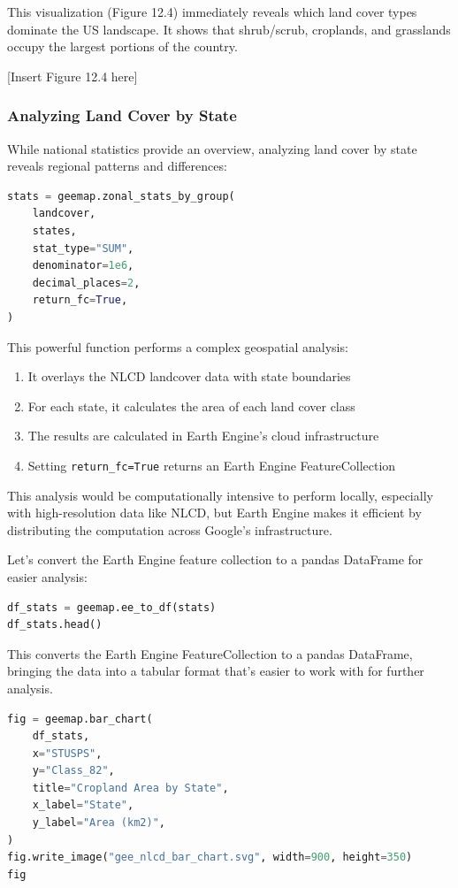 This visualization (Figure 12.4) immediately reveals which land cover types dominate the US landscape. It shows that shrub/scrub, croplands, and grasslands occupy the largest portions of the country.

[Insert Figure 12.4 here]

\subsubsection{Analyzing Land Cover by State}

While national statistics provide an overview, analyzing land cover by state reveals regional patterns and differences:

\begin{lstlisting}[language=Python]
stats = geemap.zonal_stats_by_group(
    landcover,
    states,
    stat_type="SUM",
    denominator=1e6,
    decimal_places=2,
    return_fc=True,
)
\end{lstlisting}

This powerful function performs a complex geospatial analysis:

\begin{enumerate}
\item It overlays the NLCD landcover data with state boundaries
\item For each state, it calculates the area of each land cover class
\item The results are calculated in Earth Engine's cloud infrastructure
\item Setting \texttt{return\_fc=True} returns an Earth Engine FeatureCollection
\end{enumerate}

This analysis would be computationally intensive to perform locally, especially with high-resolution data like NLCD, but Earth Engine makes it efficient by distributing the computation across Google's infrastructure.

Let's convert the Earth Engine feature collection to a pandas DataFrame for easier analysis:

\begin{lstlisting}[language=Python]
df_stats = geemap.ee_to_df(stats)
df_stats.head()
\end{lstlisting}

This converts the Earth Engine FeatureCollection to a pandas DataFrame, bringing the data into a tabular format that's easier to work with for further analysis.

\begin{lstlisting}[language=Python]
fig = geemap.bar_chart(
    df_stats,
    x="STUSPS",
    y="Class_82",
    title="Cropland Area by State",
    x_label="State",
    y_label="Area (km2)",
)
fig.write_image("gee_nlcd_bar_chart.svg", width=900, height=350)
fig
\end{lstlisting}

